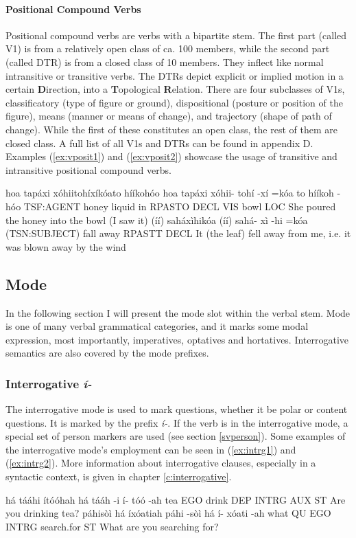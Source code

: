 \documentclass[a4paper, 12pt, oneside]{memoir}
\newcommand{\emh}[1]{\textit{#1}}
\begin{document}
\paragraph{Positional Compound Verbs}
Positional compound verbs are verbs with a bipartite stem. The first part (called V1) is from a relatively open class of ca. 100 members, while the second part (called DTR) is from a closed class of 10 members. They inflect like normal intransitive or transitive verbs. The DTRs depict explicit or implied motion in a certain \textbf{D}irection, into a \textbf{T}opological \textbf{R}elation. There are four subclasses of V1s, classificatory (type of figure or ground), dispositional (posture or position of the figure), means (manner or means of change), and trajectory (shape of path of change). While the first of these constitutes an open class, the rest of them are closed class. A full list of all V1s and DTRs can be found in appendix D. Examples (\ref{ex:vposit1}) and (\ref{ex:vposit2}) showcase the usage of transitive and intransitive positional compound verbs.
\begin{examples}
\newbaarucmd{\cl}{\baarujuncture{\texttt{==}}}
    \ex \label{ex:vposit1}
    \words hoa tapáxi xóhiitohíxíkóato hííkohóo
    \bits hoa tapáxi xóhii- tohí -xí =kóa \cl to hííkoh -hóo
    \gloss TSF:AGENT honey liquid in RPASTO DECL VIS bowl LOC
    \tr She poured the honey into the bowl (I saw it)
    \ex \label{ex:vposit2}
    \words (íí) saháxìhikóa
    \bits (íí) sahá- xì -hi =kóa 
    \gloss (TSN:SUBJECT) fall away RPASTT DECL
    \tr It (the leaf) fell away from me, i.e. it was blown away by the wind
\end{examples}

\subsection{Mode}\label{svmode}
In the following section I will present the mode slot within the verbal stem. Mode is one of many verbal grammatical categories, and it marks some modal expression, most importantly, imperatives, optatives and hortatives. Interrogative semantics are also covered by the mode prefixes. 
\subsubsection{Interrogative \emh{í-}}
The interrogative mode is used to mark questions, whether it be polar or content questions. It is marked by the prefix \emh{í-}. If the verb is in the interrogative mode, a special set of person markers are used (see section \ref{svperson}). Some examples of the interrogative mode's employment can be seen in (\ref{ex:intrg1}) and (\ref{ex:intrg2}). More information about interrogative clauses, especially in a syntactic context, is given in chapter \ref{c:interrogative}.
\begin{examples}
    \ex \label{ex:intrg1}
     há tááhi ítóóhah
     há tááh -i í- tóó -ah
    \gloss tea EGO drink DEP INTRG AUX ST 
    \tr Are you drinking tea?
    \ex \label{ex:intrg2}
    \words páhisòì há íxóatiah 
    \bits páhi -sòì há í- xóati -ah
    \gloss what QU EGO INTRG search.for ST
    \tr What are you searching for?
\end{examples}
\end{document}
